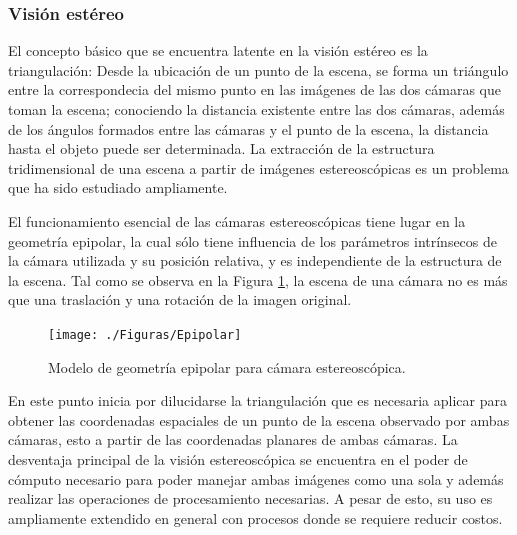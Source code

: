 \subsubsection{Visión estéreo}
El concepto básico que se encuentra latente en la visión estéreo es la triangulación: Desde la ubicación de un punto de la escena, se forma un triángulo entre la correspondecia del mismo punto en las imágenes de las dos cámaras que toman la escena; conociendo la distancia existente entre las dos cámaras, además de los ángulos formados entre las cámaras y el punto de la escena, la distancia hasta el objeto puede ser determinada. La extracción de la estructura tridimensional de una escena a partir de imágenes estereoscópicas es un problema que ha sido estudiado ampliamente.
\par El funcionamiento esencial de las cámaras estereoscópicas tiene lugar en la geometría epipolar, la cual sólo tiene influencia de los parámetros intrínsecos de la cámara utilizada y su posición relativa, y es independiente de la estructura de la escena. Tal como se observa en la Figura \ref{fig:epi}, la escena de una cámara no es más que una traslación y una rotación de la imagen original.
\begin{figure}[htbp!]
	\centering
	\texttt{[image: ./Figuras/Epipolar]}
	\caption{Modelo de geometría epipolar para cámara estereoscópica.}
	\label{fig:epi}
\end{figure}
\par En este punto inicia por dilucidarse la triangulación que es necesaria aplicar para obtener las coordenadas espaciales de un punto de la escena observado por ambas cámaras, esto a partir de las coordenadas planares de ambas cámaras. La desventaja principal de la visión estereoscópica se encuentra en el poder de cómputo necesario para poder manejar ambas imágenes como una sola y además realizar las operaciones de procesamiento necesarias. A pesar de esto, su uso es ampliamente extendido en general con procesos donde se requiere reducir costos.
